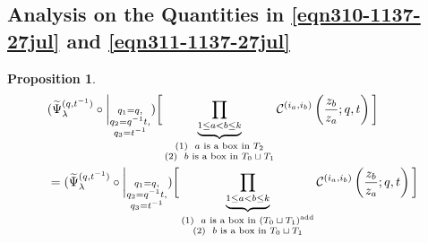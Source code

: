 \documentclass[12pt,reqno,a4paper]{amsart}
\newcommand{\comp}{\circ}
\newcommand{\cals}[1]{\mathcal{#1}}
\numberwithin{equation}{section}
\newtheorem{prop}[thm]{Proposition}
\theoremstyle{definition}
\begin{document}
\subsection{Analysis on the Quantities in  \eqref{eqn310-1137-27jul} and \eqref{eqn311-1137-27jul}}




\begin{prop}\mbox{}
\label{prp313-1201-27jul}
\footnotesize
\begin{align}
&(
\widetilde{\Psi}_{\lambda}^{(q,t^{-1})}
\comp 
\bigg|_{
	\substack{
		q_1 = q, \\
		q_2 = q^{-1}t,\\
		q_3 = t^{-1} \\
	}
}
)
\bigg[
\underbrace{	\prod_{1 \leq a < b \leq k}				}_{
	\substack{
		(1) \,\, \text{ $a$ is a box in $T_2$}
		\\
		(2) \,\, \text{ $b$ is a box in $T_0 \sqcup T_1$}
	}
}
\cals{C}^{(i_a,i_b)}\left(
\frac{z_b}{z_a}
; q, t
\right)
\bigg]
\\
&= 
(
\widetilde{\Psi}_{\lambda}^{(q,t^{-1})}
\comp 
\bigg|_{
	\substack{
		q_1 = q, \\
		q_2 = q^{-1}t,\\
		q_3 = t^{-1} \\
	}
}
)
\bigg[
\underbrace{	\prod_{1 \leq a < b \leq k}				}_{
	\substack{
		(1) \,\, \text{ $a$ is a box in $(T_0 \sqcup T_1)^{\operatorname{add}}$}
		\\
		(2) \,\, \text{ $b$ is a box in $T_0 \sqcup T_1$}
	}
}
\cals{C}^{(i_a,i_b)}\left(
\frac{z_b}{z_a}
; q, t
\right)
\bigg]
\notag 
\end{align}
\normalsize
\end{prop}
\end{document}
